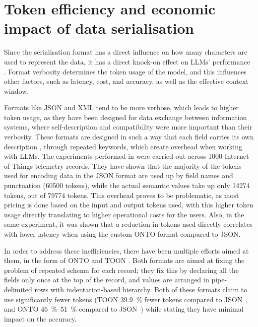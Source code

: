 \section{Token efficiency and economic impact of data serialisation} \label{sec:token-efficiency}

Since the serialisation format has a direct influence on how many characters are used to represent the data,
it has a direct knock-on effect on LLMs' performance \cite{liu2024lost}. Format verbosity determines the token
usage of the model, and this influences other factors, such as latency, cost, and accuracy, as well as the
effective context window.

Formats like JSON and XML tend to be more verbose, which leads to higher token usage, as they have been
designed for data exchange between information systems, where self-description and compatibility were more
important than their verbosity. These formats are designed in such a way that each field carries its own
description \cite{bray1998xml, bray2017javascript}, through repeated keywords, which create overhead when
working with LLMs. The experiments performed in \cite{onto-serialization-format} were carried out across
\num{1000} Internet of Things telemetry records. They have shown that the majority of the tokens used for
encoding data in the JSON format are used up by field names and punctuation (\num{60500} tokens), while the
actual semantic values take up only \num{14274} tokens, out of \num{79774} tokens. This overhead proves to be
problematic, as most pricing is done based on the input and output tokens used, with this higher token usage
directly translating to higher operational costs for the users. Also, in the same experiment, it was shown
that a reduction in tokens used directly correlates with lower latency when using the custom ONTO format
compared to JSON.

In order to address these inefficiencies, there have been multiple efforts aimed at them, in the form of ONTO
\cite{onto-serialization-format} and TOON \cite{toon-format-2025}. Both formats are aimed at fixing the
problem of repeated schema for each record; they fix this by declaring all the fields only once at the top of
the record, and values are arranged in pipe-delimited rows with indentation-based hierarchy. Both of these
formats claim to use significantly fewer tokens (TOON \qty{39.9}{\percent} fewer tokens compared to
  JSON~\cite{toon-format-2025}, and ONTO \qtyrange{46}{51}{\percent} compared to
JSON~\cite{onto-serialization-format}) while stating they have minimal impact on the accuracy.

